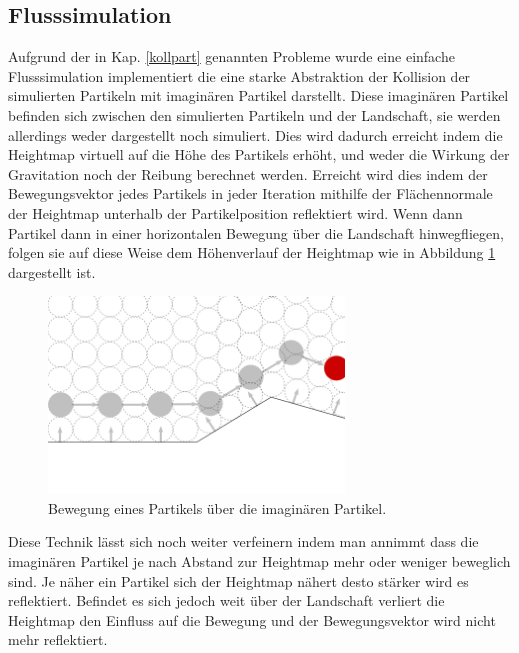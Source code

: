 \begin{Spacing}{\mylinespace}
	\subsection{Flusssimulation}
		Aufgrund der in Kap. \ref{kollpart} genannten Probleme wurde eine
		einfache Flusssimulation implementiert die eine starke Abstraktion
		der Kollision der simulierten Partikeln mit imaginären Partikel darstellt.
		Diese imaginären Partikel befinden sich zwischen den simulierten
		Partikeln und der Landschaft, sie werden allerdings weder dargestellt
		noch simuliert. Dies wird dadurch erreicht indem die Heightmap virtuell
		auf die Höhe des Partikels erhöht, und weder die Wirkung der Gravitation
		noch der Reibung berechnet werden. Erreicht wird dies indem der 
		Bewegungsvektor jedes Partikels in jeder Iteration mithilfe der
		Flächennormale der Heightmap unterhalb der Partikelposition
		reflektiert wird.
		Wenn dann Partikel dann in einer horizontalen Bewegung über die 
		Landschaft hinwegfliegen, folgen sie auf diese Weise dem Höhenverlauf
		der Heightmap wie in Abbildung \ref{fig:flow1} dargestellt ist.
		\begin{figure}[h!]
			\centering
			\vspace*{30px}
			\includegraphics[width=0.7\textwidth]{graphics/Phys_flow1.png}
			\caption{ Bewegung eines Partikels über die imaginären Partikel. }
			\label{fig:flow1}
		\end{figure}
		Diese Technik lässt sich noch weiter verfeinern indem man annimmt dass
		die imaginären Partikel je nach Abstand zur Heightmap mehr oder weniger
		beweglich sind. Je näher ein Partikel sich der Heightmap nähert desto
		stärker wird es reflektiert. Befindet es sich jedoch weit über der
		Landschaft verliert die Heightmap den Einfluss auf die Bewegung und der
		Bewegungsvektor wird nicht mehr reflektiert.
		\begin{figure}[h!]
			\centering
			\vspace*{30px}

\end{figure}
\end{Spacing}
